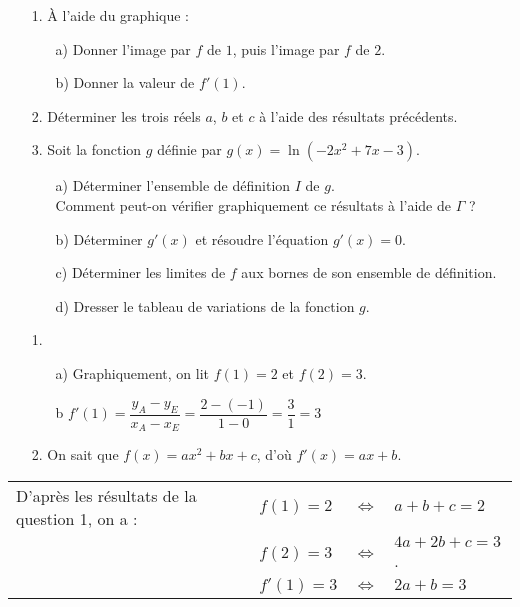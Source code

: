 \begin{itemize}
\item[1.] À l'aide du graphique : \\
\begin{itemize}
\item[a)] Donner l'image par $f$ de $1$, puis l'image par $f$ de $2$. 
\item[b)] Donner la valeur de $f'(1)$. \\
\end{itemize}
\item[2.] Déterminer les trois réels $a$, $b$ et $c$ à l'aide des résultats précédents. \\
\item[3.] Soit la fonction $g$ définie par $g(x) = \ln \left(-2x^2 + 7x - 3\right)$. \\
\begin{itemize}
\item[a)] Déterminer l'ensemble de définition $I$ de $g$. \\ Comment peut-on vérifier graphiquement ce résultats à l'aide de $\Gamma$ ?
\item[b)] Déterminer $g'(x)$ et résoudre l'équation $g'(x) = 0$.
\item[c)] Déterminer les limites de $f$ aux bornes de son ensemble de définition. 
\item[d)] Dresser le tableau de variations de la fonction $g$.
\end{itemize}
\end{itemize}

\newpage

\begin{itemize}
\item[1.]
\begin{itemize}
\item[a)] Graphiquement, on lit $f(1) = 2$ et $f(2) = 3$. \\
\item[b] $f'(1) = \dfrac{y_A - y_E}{x_A - x_E} = \dfrac{2-\left(-1\right)}{1 - 0} = \dfrac{3}{1} = 3$ \\
\end{itemize}
\item[2.] On sait que $f(x) = ax^2 + bx + c$, d'où $f'(x) = ax + b$. \\
\end{itemize}

\begin{tabular}{llll}
D'après les résultats de la question 1, on a : & $f(1) = 2$ & $\Longleftrightarrow$ & $a + b + c = 2$ \\
& $f(2) = 3$ & $\Longleftrightarrow$ & $4a + 2b + c = 3$. \\
& $f'(1) = 3$ & $\Longleftrightarrow$ & $2a + b = 3$ \\
\end{tabular}

